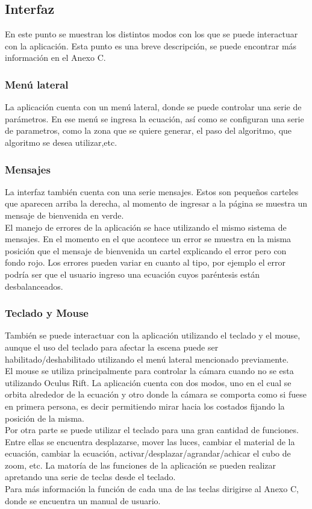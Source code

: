 \documentclass[12pt]{article}
\begin{document}
\subsection{Interfaz}
En este punto se muestran los distintos modos con los que se puede interactuar con la aplicación. Esta punto es una breve descripción, se puede encontrar más información en el Anexo C.
\subsubsection{Menú lateral}
La aplicación cuenta con un menú lateral, donde se puede controlar una serie de parámetros. En ese menú se ingresa la ecuación, así como se configuran una serie de parametros, como la zona que se quiere generar, el paso del algoritmo, que algoritmo se desea utilizar,etc. 
\subsubsection{Mensajes}
La interfaz también cuenta con una serie mensajes. Estos son pequeños carteles que aparecen arriba la derecha, al momento de ingresar a la página se muestra un mensaje de bienvenida en verde. 
\\El manejo de errores de la aplicación se hace utilizando el mismo sistema de mensajes. En el momento en el que acontece un error se muestra en la misma posición que el mensaje de bienvenida un cartel explicando el error pero con fondo rojo. Los errores pueden variar en cuanto al tipo, por ejemplo el error podría ser que el usuario ingreso una ecuación cuyos paréntesis están desbalanceados.
\subsubsection{Teclado y Mouse}
También se puede interactuar con la aplicación utilizando el teclado y el mouse, aunque el uso del teclado para afectar la escena puede ser habilitado/deshabilitado utilizando el menú lateral mencionado previamente.
\\El mouse se utiliza principalmente para controlar la cámara cuando no se esta utilizando Oculus Rift. La aplicación cuenta con dos modos, uno en el cual se orbita alrededor de la ecuación y otro donde la cámara se comporta como si fuese en primera persona, es decir permitiendo mirar hacia los costados fijando la posición de la misma.
\\Por otra parte se puede utilizar el teclado para una gran cantidad de funciones. Entre ellas se encuentra desplazarse, mover las luces, cambiar el material de la ecuación, cambiar la ecuación, activar/desplazar/agrandar/achicar el cubo de zoom, etc. La matoría de las funciones de la aplicación se pueden realizar apretando una serie de teclas desde el teclado.
\\Para más información la función de cada una de las teclas dirigirse al Anexo C, donde se encuentra un manual de usuario.
\clearpage
\end{document}
